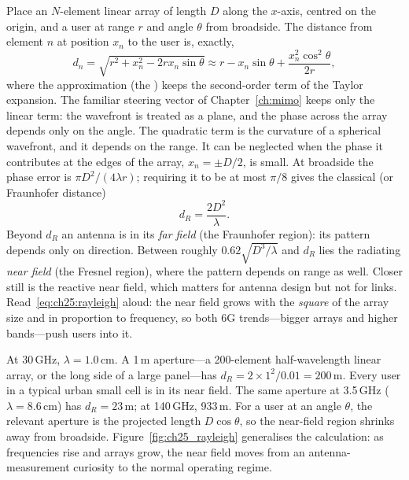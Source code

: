 Place an $N$-element linear array of length $D$ along the $x$-axis, centred on the origin, and a user
at range $r$ and angle $\theta$ from broadside. The distance from element $n$ at position $x_n$ to the
user is, exactly,
\begin{equation}
d_n=\sqrt{r^2+x_n^2-2rx_n\sin\theta}\approx r-x_n\sin\theta+\frac{x_n^2\cos^2\theta}{2r},
\label{eq:ch25:fresnel}
\end{equation}
where the approximation (the ) keeps the second-order term of the Taylor
expansion. The familiar steering vector of Chapter~\ref{ch:mimo} keeps only the linear term: the
wavefront is treated as a plane, and the phase across the array depends only on the angle. The
quadratic term is the curvature of a spherical wavefront, and it depends on the range. It can be
neglected when the phase it contributes at the edges of the array, $x_n=\pm D/2$, is small. At
broadside the phase error is $\pi D^2/(4\lambda r)$; requiring it to be at most $\pi/8$ gives the
classical  (or Fraunhofer distance)
\begin{equation}
d_R=\frac{2D^2}{\lambda}.
\label{eq:ch25:rayleigh}
\end{equation}
Beyond $d_R$ an antenna is in its \emph{far field} (the Fraunhofer region): its pattern depends only on
direction. Between roughly $0.62\sqrt{D^3/\lambda}$ and $d_R$ lies the radiating \emph{near field}
(the Fresnel region), where the pattern depends on range as well. Closer still is the reactive near
field, which matters for antenna design but not for links. Read~\eqref{eq:ch25:rayleigh} aloud: the
near field grows with the \emph{square} of the array size and in proportion to frequency, so both
6G trends---bigger arrays and higher bands---push users into it.

\begin{worked}
At 30\,GHz, $\lambda=1.0$\,cm. A 1\,m aperture---a 200-element half-wavelength linear array, or the
long side of a large panel---has $d_R=2\times1^2/0.01=200$\,m. Every user in a typical urban small cell
is in its near field. The same aperture at 3.5\,GHz ($\lambda=8.6$\,cm) has $d_R=23$\,m; at 140\,GHz,
933\,m. For a user at an angle $\theta$, the relevant aperture is the projected length $D\cos\theta$,
so the near-field region shrinks away from broadside. Figure~\ref{fig:ch25_rayleigh} generalises the
calculation: as frequencies rise and arrays grow, the near field moves from an antenna-measurement
curiosity to the normal operating regime.
\end{worked}

